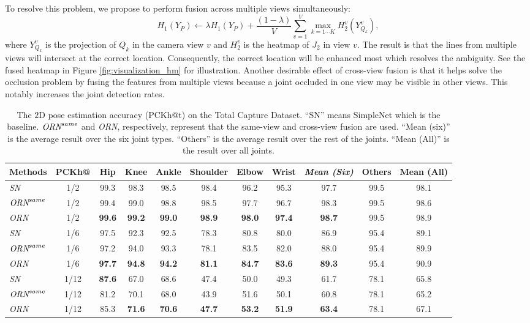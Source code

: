 \documentclass[10pt,twocolumn,letterpaper]{article}
\begin{document}
To resolve this problem, we propose to perform fusion across multiple views simultaneously:
\begin{equation}
    {H}_1({Y}_{{P}}) \leftarrow \lambda {H}_1({Y}_{{P}}) +\frac{(1-\lambda)}{V} \sum_{v=1}^{V} \max_{k=1 \cdots K}{{H}_2^v{({Y}^v_{{Q}_k})}},
\end{equation}
where ${Y}^v_{{Q}_k}$ is the projection of ${Q}_k$ in the camera view $v$ and ${H}_2^v$ is the heatmap of ${J}_2$ in view $v$. The result is that the lines from multiple views will intersect at the correct location. Consequently, the correct location will be enhanced most which resolves the ambiguity. See the fused heatmap in Figure \ref{fig:visualization_hm} for illustration. Another desirable effect of cross-view fusion is that it helps solve the occlusion problem by fusing the features from multiple views because a joint occluded in one view may be visible in other views. This notably increases the joint detection rates.


\begin{table*}[]
\center
\caption{The $2$D pose estimation accuracy (PCKh@t) on the Total Capture Dataset. ``SN'' means SimpleNet which is the baseline. 
$\emph{ORN}^{same}$ and \emph{ORN}, respectively, represent that the same-view and cross-view fusion are used.  ``Mean (six)'' is the average result over the six joint types. ``Others'' is the average result over the rest of the joints. ``Mean (All)'' is the result over all joints.}
\label{table:detectionrate}
\begin{tabular}{lc||ccccccc||c||c}
\toprule
      Methods & PCKh@ & Hip    & Knee   & Ankle  & Shoulder & Elbow  & Wrist & \emph{Mean (Six)} & {Others} & Mean (All) \\ \hline
\emph{SN}    & 1/2  & 99.3 & 98.3 & 98.5 & 98.4 & 96.2 & 95.3 & 97.7 & 99.5 & 98.1 \\
$\emph{ORN}^{same}$  & 1/2  & 99.4 & 99.0 & 98.8 & 98.5 & 97.7 & 96.7 & 98.3 & 99.5 & 98.6\\
\emph{ORN} & 1/2  & \textbf{99.6} & \textbf{99.2} & \textbf{99.0} & \textbf{98.9} & \textbf{98.0} & \textbf{97.4} & \textbf{98.7} & 99.5 & {98.9}\\ \hline
\emph{SN}    & 1/6  & 97.5 & 92.3 & 92.5 & 78.3 & 80.8 & 80.0 & 86.9 & 95.4 & 89.1\\
$\emph{ORN}^{same}$  & 1/6  & 97.2 & 94.0 & 93.3 & 78.1 & 83.5 & 82.0 & 88.0 & 95.4 & 89.9\\
\emph{ORN} & 1/6  & \textbf{97.7} & \textbf{94.8} & \textbf{94.2} & \textbf{81.1} & \textbf{84.7} & \textbf{83.6} & \textbf{89.3} & 95.4 & {90.9}\\ \hline
\emph{SN}    & 1/12 & \textbf{87.6} & 67.0 & 68.6 & 47.4 & 50.0 & 49.3 & 61.7 & 78.1 & 65.8\\
$\emph{ORN}^{same}$  & 1/12 & 81.2 & 70.1 & 68.0 & 43.9 & 51.6 & 50.1 & 60.8 & 78.1 & 65.2\\
\emph{ORN} & 1/12 & 85.3 & \textbf{71.6} & \textbf{70.6} & \textbf{47.7} & \textbf{53.2} & \textbf{51.9} & \textbf{63.4} & 78.1 & {67.1}\\
\toprule
\end{tabular}
\end{table*}
\end{document}
